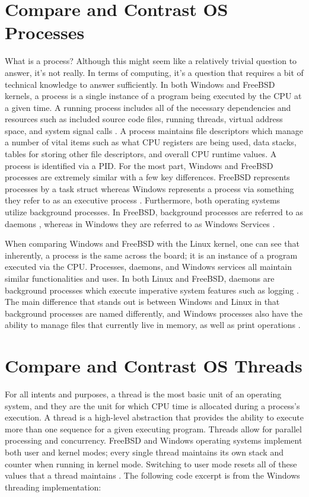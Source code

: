 \documentclass[letterpaper,10pt,draftclsnofoot,onecolumn]{IEEEtran}
\begin{document}
\section{Compare and Contrast OS Processes}
What is a process? Although this might seem like a relatively trivial question to answer, it’s not really. In terms of computing, it’s a question that requires a bit of technical knowledge to answer sufficiently. In both Windows and FreeBSD kernels, a process is a single instance of a program being executed by the CPU at a given time. A running process includes all of the necessary dependencies and resources such as included source code files, running threads, virtual address space, and system signal calls \cite{MSWindows1} \cite{FreeBSD2}. A process maintains file descriptors which manage a number of vital items such as what CPU registers are being used, data stacks, tables for storing other file descriptors, and overall CPU runtime values. A process is identified via a PID. For the most part, Windows and FreeBSD processes are extremely similar with a few key differences. FreeBSD represents processes by a task struct whereas Windows represents a process via something they refer to as an executive process \cite{MSWindows1}. Furthermore, both operating systems utilize background processes. In FreeBSD, background processes are referred to as daemons \cite{FreeBSD2}, whereas in Windows they are referred to as Windows Services \cite{MSWindows1}.

When comparing Windows and FreeBSD with the Linux kernel, one can see that inherently, a process is the same across the board; it is an instance of a program executed via the CPU. Processes, daemons, and Windows services all maintain similar functionalities and uses. In both Linux and FreeBSD, daemons are background processes which execute imperative system features such as logging \cite{FreeBSD2} \cite{Linux}. The main difference that stands out is between Windows and Linux in that background processes are named differently, and Windows processes also have the ability to manage files that currently live in memory, as well as print operations \cite{MSWindows1}.\\

\section{Compare and Contrast OS Threads}
For all intents and purposes, a thread is the most basic unit of an operating system, and they are the unit for which CPU time is allocated during a process’s execution. A thread is a high-level abstraction that provides the ability to execute more than one sequence for a given executing program. Threads allow for parallel processing and concurrency. FreeBSD and Windows operating systems implement both user and kernel modes; every single thread maintains its own stack and counter when running in kernel mode. Switching to user mode resets all of these values that a thread maintains \cite{MSWindows1} \cite{FreeBSD2}. The following code excerpt is from the Windows threading implementation: \cite{PsCreateSystemThread} \cite{MSWindows3} \\
\end{document}
